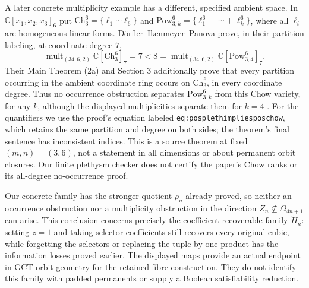 A later concrete multiplicity example has a different, specified ambient
space. In $\mathbb C[x_1,x_2,x_3]_6$ put
$\mathrm{Ch}_3^6=\{\ell_1\cdots\ell_6\}$ and
$\mathrm{Pow}_{3,k}^6=\overline{\{\ell_1^6+\cdots+\ell_k^6\}}$,
where all $\ell_i$ are homogeneous linear forms. D\"orfler--Ikenmeyer--Panova
prove, in their partition labeling, at coordinate degree $7$,
\[
 \operatorname{mult}_{(34,6,2)}\mathbb C[\mathrm{Ch}_3^6]_7
 =7<8=
 \operatorname{mult}_{(34,6,2)}\mathbb C[\mathrm{Pow}_{3,4}^6]_7.
\]
Their Main Theorem (2a) and Section 3 additionally prove that every
partition occurring in the ambient coordinate ring occurs on
$\mathrm{Ch}_3^6$, in every coordinate degree. Thus no occurrence
obstruction separates $\mathrm{Pow}_{3,k}^6$ from this Chow variety,
for any $k$, although the displayed multiplicities separate them for
$k=4$ \cite{DIP2019Interface}. For the quantifiers we use the proof's
equation labeled \texttt{eq:posplethimpliesposchow}, which retains
the same partition and degree on both sides; the theorem's final
sentence has inconsistent indices. This is a source theorem at fixed
$(m,n)=(3,6)$, not a statement in all dimensions or about permanent
orbit closures. Our finite plethysm checker does not certify the
paper's Chow ranks or its all-degree no-occurrence proof.

Our concrete family has the stronger quotient $\rho_n$ already proved,
so neither an occurrence obstruction nor a multiplicity obstruction
in the direction $Z_n\not\subseteq\Omega_{4n+1}$ can arise.
This conclusion concerns precisely the coefficient-recoverable family
$\widetilde H_n$: setting $z=1$ and taking selector coefficients still
recovers every original cubic, while forgetting the selectors or
replacing the tuple by one product has the information losses proved
earlier. The displayed maps provide an actual endpoint in GCT orbit
geometry for the retained-fibre construction. They do not identify this
family with padded permanents or supply a Boolean satisfiability reduction.
